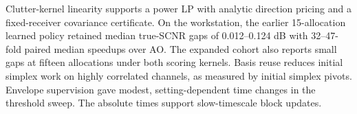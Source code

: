 \documentclass[journal]{IEEEtran}
\begin{document}
Clutter-kernel linearity supports a power LP with analytic direction pricing and a fixed-receiver covariance certificate. On the workstation, the earlier 15-allocation learned policy retained median true-SCNR gaps of 0.012--0.124 dB with 32--47-fold paired median speedups over AO. The expanded cohort also reports small gaps at fifteen allocations under both scoring kernels. Basis reuse reduces initial simplex work on highly correlated channels, as measured by initial simplex pivots. Envelope supervision gave modest, setting-dependent time changes in the threshold sweep. The absolute times support slow-timescale block updates.



\end{document}
